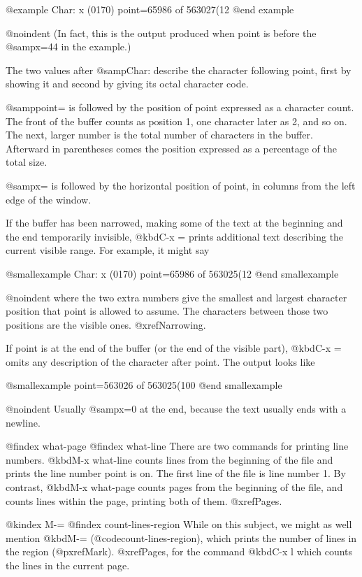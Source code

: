 {{{{{@example
Char: x (0170)  point=65986 of 563027(12%
@end example

@noindent
(In fact, this is the output produced when point is before the @samp{x=44}
in the example.)

  The two values after @samp{Char:} describe the character following point,
first by showing it and second by giving its octal character code.

  @samp{point=} is followed by the position of point expressed as a character
count.  The front of the buffer counts as position 1, one character later
as 2, and so on.  The next, larger number is the total number of characters
in the buffer.  Afterward in parentheses comes the position expressed as a
percentage of the total size.

  @samp{x=} is followed by the horizontal position of point, in columns from the
left edge of the window.

  If the buffer has been narrowed, making some of the text at the beginning and
the end temporarily invisible, @kbd{C-x =} prints additional text describing the
current visible range.  For example, it might say

@smallexample
Char: x (0170)  point=65986 of 563025(12%
@end smallexample

@noindent
where the two extra numbers give the smallest and largest character position
that point is allowed to assume.  The characters between those two positions
are the visible ones.  @xref{Narrowing}.

  If point is at the end of the buffer (or the end of the visible part),
@kbd{C-x =} omits any description of the character after point.
The output looks like

@smallexample
point=563026 of 563025(100%
@end smallexample

@noindent
Usually @samp{x=0} at the end, because the text usually ends with a newline.

@findex what-page
@findex what-line
  There are two commands for printing line numbers.  @kbd{M-x what-line}
counts lines from the beginning of the file and prints the line number
point is on.  The first line of the file is line number 1.  By contrast,
@kbd{M-x what-page} counts pages from the beginning of the file, and
counts lines within the page, printing both of them.  @xref{Pages}.

@kindex M-=
@findex count-lines-region
  While on this subject, we might as well mention @kbd{M-=} (@code{count-lines-region}),
which prints the number of lines in the region (@pxref{Mark}).
@xref{Pages}, for the command @kbd{C-x l} which counts the lines in the
current page.

}}}}}
